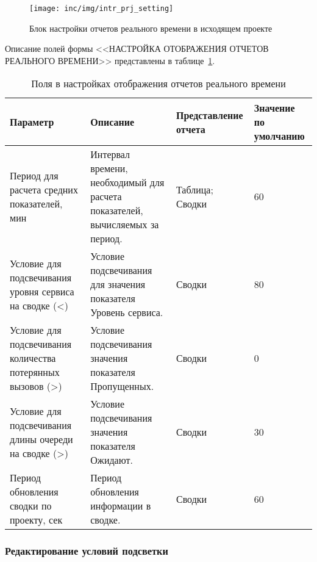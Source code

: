 \begin{figure}[!ht]
    \centering
    \texttt{[image: inc/img/intr\_prj\_setting]}
    \caption{Блок настройки отчетов реального времени в исходящем проекте}
    \label{pic:prj:setting:fields}
\end{figure}

Описание полей формы <<НАСТРОЙКА ОТОБРАЖЕНИЯ ОТЧЕТОВ РЕАЛЬНОГО ВРЕМЕНИ>> представлены в таблице~\ref{tab:prj:setting:fields}.
\begin{table}[ht]
    \caption{Поля в настройках отображения отчетов реального времени}
    \begin{small}
        \begin{tabular}{|p{}|p{}|p{}|p{}|}
            \hline
            Параметр & Описание & Представление отчета & Значение по умолчанию \\
            \hline
            Период для расчета средних показателей, мин &
            Интервал времени, необходимый для расчета показателей, вычисляемых за период. &
            Таблица; Сводки &
            60\\
            \hline
            Условие для подсвечивания уровня сервиса на сводке (<) &
            Условие подсвечивания для значения показателя Уровень сервиса. &
            Сводки &
            80 \\
            \hline
            Условие для подсвечивания количества потерянных вызовов (>) &
            Условие подсвечивания значения показателя Пропущенных. &
            Сводки &
            0 \\
            \hline
            Условие для подсвечивания длины очереди на сводке (>) &
            Условие подсвечивания значения показателя Ожидают. &
            Сводки &
            30 \\
            \hline
            Период обновления сводки по проекту, сек &
            Период обновления информации в сводке. &
            Сводки &
            60 \\
            \hline
        \end{tabular}
    \end{small}
    \label{tab:prj:setting:fields}
\end{table}

\subsubsection{Редактирование условий подсветки}


